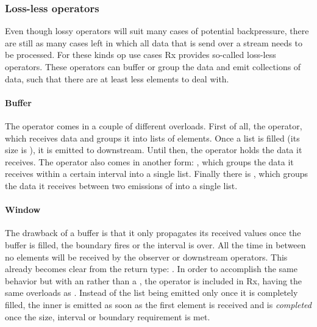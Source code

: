 \subsubsection{Loss-less operators}
Even though lossy operators will suit many cases of potential backpressure, there are still as many cases left in which all data that is send over a stream needs to be processed. For these kinds op use cases Rx provides so-called loss-less operators. These operators can buffer or group the data and emit collections of data, such that there are at least less elements to deal with.

\paragraph{Buffer} The  operator comes in a couple of different overloads. First of all, the  operator, which receives data and groups it into lists of  elements. Once a list is filled (its size is ), it is emitted to downstream. Until then, the operator holds the data it receives. The  operator also comes in another form: , which groups the data it receives within a certain interval into a single list. Finally there is , which groups the data it receives between two emissions of  into a single list.

\paragraph{Window} The drawback of a buffer is that it only propagates its received values once the buffer is filled, the boundary \obs fires or the interval is over. All the time in between no elements will be received by the observer or downstream operators. This already becomes clear from the return type: . In order to accomplish the same behavior but with an \obs rather than a , the  operator is included in Rx, having the same overloads as . Instead of the list being emitted only once it is completely filled, the inner \obs is emitted as soon as the first element is received and is \emph{completed} once the size, interval or boundary requirement is met.

